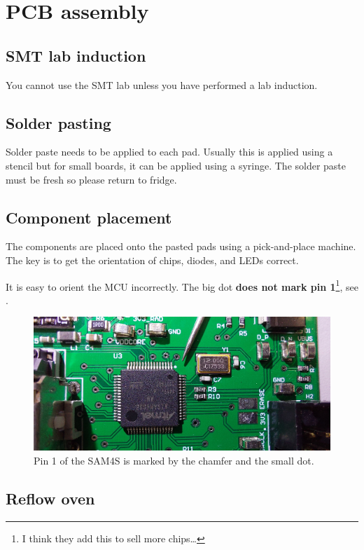 \chapter{PCB assembly}


\section{SMT lab induction}

You cannot use the SMT lab unless you have performed a lab induction.


\section{Solder pasting}

Solder paste needs to be applied to each pad.  Usually this is applied
using a stencil but for small boards, it can be applied using a
syringe.  The solder paste must be fresh so please return to fridge.


\section{Component placement}

The components are placed onto the pasted pads using a pick-and-place
machine.  The key is to get the orientation of chips, diodes, and LEDs
correct.

It is easy to orient the MCU incorrectly.  The big dot \textbf{does
  not mark pin 1}\footnote{I think they add this to sell more
  chips\ldots}, see .


\begin{figure}[!h]
  \centering
  \includegraphics[width=6in]{figs/sam4s_orientation.jpg}
  \caption{Pin 1 of the SAM4S is marked by the chamfer and the small
    dot.}
  \label{fig:pin1}
\end{figure}


\section{Reflow oven}

